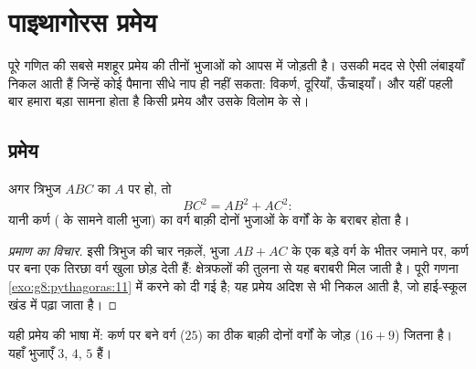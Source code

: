 \chapter{पाइथागोरस प्रमेय}\label{ch:g8:pythagoras}

पूरे गणित की सबसे मशहूर प्रमेय  की तीनों भुजाओं को आपस
में जोड़ती है। उसकी मदद से ऐसी लंबाइयाँ निकल आती हैं जिन्हें कोई
पैमाना सीधे नाप ही नहीं सकता: विकर्ण, दूरियाँ, ऊँचाइयाँ। और यहीं
पहली बार हमारा बड़ा सामना होता है किसी प्रमेय और उसके विलोम के 
से।

\section{प्रमेय}

\begin{theorem}[पाइथागोरस]\label{thm:g8:pythagoras:direct}
अगर त्रिभुज $ABC$ का $A$ पर  हो, तो
\[
BC^2 = AB^2 + AC^2 :
\]
यानी कर्ण ( के सामने वाली भुजा) का वर्ग बाक़ी दोनों भुजाओं के
वर्गों के  के बराबर होता है।
\end{theorem}

\begin{proof}[प्रमाण का विचार]
इसी त्रिभुज की चार नक़लें, भुजा $AB + AC$ के एक बड़े वर्ग के भीतर
जमाने पर, कर्ण पर बना एक तिरछा वर्ग खुला छोड़ देती हैं: क्षेत्रफलों
की तुलना से यह बराबरी मिल जाती है। पूरी गणना
\cref{exo:g8:pythagoras:11} में करने को दी गई है; यह प्रमेय अदिश
 से भी निकल आती है, जो हाई-स्कूल खंड में पढ़ा जाता है।
\end{proof}

\begin{omfigure}

{\small यही प्रमेय  की भाषा में: कर्ण पर बने वर्ग ($25$)
का  ठीक बाक़ी दोनों वर्गों के जोड़ ($16 + 9$) जितना है।
यहाँ भुजाएँ $3$, $4$, $5$ हैं।}
\end{omfigure}

